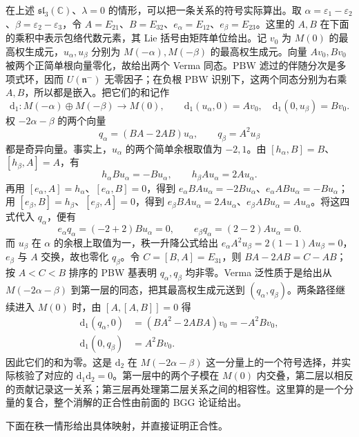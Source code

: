 在上述 \(\mathfrak{sl}_3(\mathbb C)\)、\(\lambda=0\) 的情形，可以把一条关系的符号实际算出。取 \(\alpha=\varepsilon_1-\varepsilon_2\)、\(\beta=\varepsilon_2-\varepsilon_3\)，令 \(A=E_{21}\)、\(B=E_{32}\)、\(e_\alpha=E_{12}\)、\(e_\beta=E_{23}\)。这里的 \(A,B\) 在下面的乘积中表示包络代数元素，其 Lie 括号由矩阵单位给出。记 \(v_0\) 为 \(M(0)\) 的最高权生成元，\(u_\alpha,u_\beta\) 分别为 \(M(-\alpha),M(-\beta)\) 的最高权生成元。向量 \(Av_0,Bv_0\) 被两个正简单根向量零化，故给出两个 Verma 同态。PBW 滤过的伴随分次是多项式环，因而 \(U(\mathfrak n^-)\) 无零因子；在负根 PBW 识别下，这两个同态分别为右乘 \(A,B\)，所以都是嵌入。把它们的和记作
\[
	\mathrm{d}_1:M(-\alpha)\oplus M(-\beta)\longrightarrow M(0), \qquad \mathrm{d}_1(u_\alpha,0)=Av_0, \quad \mathrm{d}_1(0,u_\beta)=Bv_0.
\]
权 \(-2\alpha-\beta\) 的两个向量
\[
	q_\alpha=(BA-2AB)u_\alpha,\qquad q_\beta=A^2u_\beta
\]
都是奇异向量。事实上，\(u_\alpha\) 的两个简单余根取值为 \(-2,1\)。由 \([h_\alpha,B]=B\)、\([h_\beta,A]=A\)，有
\[
	h_\alpha Bu_\alpha=-Bu_\alpha,\qquad h_\beta Au_\alpha=2Au_\alpha.
\]
再用 \([e_\alpha,A]=h_\alpha\)、\([e_\alpha,B]=0\)，得到 \(e_\alpha BAu_\alpha=-2Bu_\alpha\)、\(e_\alpha ABu_\alpha=-Bu_\alpha\)；用 \([e_\beta,B]=h_\beta\)、\([e_\beta,A]=0\)，得到 \(e_\beta BAu_\alpha=2Au_\alpha\)、\(e_\beta ABu_\alpha=Au_\alpha\)。将这四式代入 \(q_\alpha\)，便有
\[
	e_\alpha q_\alpha=(-2+2)Bu_\alpha=0,\qquad e_\beta q_\alpha=(2-2)Au_\alpha=0.
\]
而 \(u_\beta\) 在 \(\alpha\) 的余根上取值为一，秩一升降公式给出 \(e_\alpha A^2u_\beta=2(1-1)Au_\beta=0\)，\(e_\beta\) 与 \(A\) 交换，故也零化 \(q_\beta\)。令 \(C=[B,A]=E_{31}\)，则 \(BA-2AB=C-AB\)；按 \(A<C<B\) 排序的 PBW 基表明 \(q_\alpha,q_\beta\) 均非零。Verma 泛性质于是给出从 \(M(-2\alpha-\beta)\) 到第一层的同态，把其最高权生成元送到 \((q_\alpha,q_\beta)\)。两条路径继续进入 \(M(0)\) 时，由 \([A,[A,B]]=0\) 得
\[
	\begin{aligned}
		\mathrm{d}_1(q_\alpha,0) &=(BA^2-2ABA)v_0=-A^2Bv_0,\\
		\mathrm{d}_1(0,q_\beta)&=A^2Bv_0.
	\end{aligned}
\]
因此它们的和为零。这是 \(\mathrm{d}_2\) 在 \(M(-2\alpha-\beta)\) 这一分量上的一个符号选择，并实际核验了对应的 \(\mathrm{d}_1\mathrm{d}_2=0\)。第一层中的两个子模在 \(M(0)\) 内交叠，第二层以相反的贡献记录这一关系；第三层再处理第二层关系之间的相容性。这里算的是一个分量的复合，整个消解的正合性由前面的 BGG 论证给出。

\ProseParagraphBreak

下面在秩一情形给出具体映射，并直接证明正合性。

